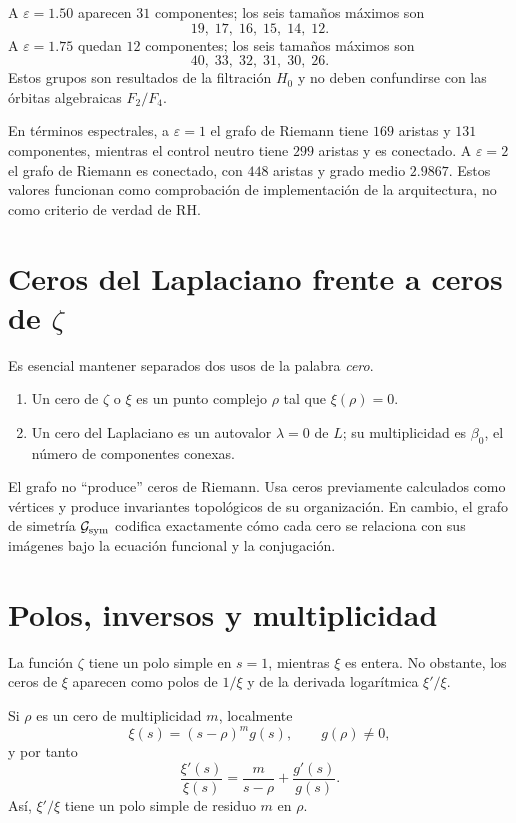 \documentclass[11pt]{amsart}
\theoremstyle{definition}
\theoremstyle{remark}
\begin{document}
A $\varepsilon=1.50$ aparecen $31$ componentes; los seis tamaños máximos son
\[
19,\;17,\;16,\;15,\;14,\;12.
\]
A $\varepsilon=1.75$ quedan $12$ componentes; los seis tamaños máximos son
\[
40,\;33,\;32,\;31,\;30,\;26.
\]
Estos grupos son resultados de la filtración $H_0$ y no deben confundirse con las órbitas algebraicas $F_2/F_4$.

En términos espectrales, a $\varepsilon=1$ el grafo de Riemann tiene $169$ aristas y $131$ componentes, mientras el control neutro tiene $299$ aristas y es conectado. A $\varepsilon=2$ el grafo de Riemann es conectado, con $448$ aristas y grado medio $2.9867$. Estos valores funcionan como comprobación de implementación de la arquitectura, no como criterio de verdad de RH.

\section{Ceros del Laplaciano frente a ceros de $\zeta$}
Es esencial mantener separados dos usos de la palabra \emph{cero}.

\begin{enumerate}[label=(\alph*)]
\item Un cero de $\zeta$ o $\xi$ es un punto complejo $\rho$ tal que $\xi(\rho)=0$.
\item Un cero del Laplaciano es un autovalor $\lambda=0$ de $L$; su multiplicidad es $\beta_0$, el número de componentes conexas.
\end{enumerate}

El grafo no ``produce'' ceros de Riemann. Usa ceros previamente calculados como vértices y produce invariantes topológicos de su organización. En cambio, el grafo de simetría $\mathcal G_{\rm sym}$ codifica exactamente cómo cada cero se relaciona con sus imágenes bajo la ecuación funcional y la conjugación.

\section{Polos, inversos y multiplicidad}
La función $\zeta$ tiene un polo simple en $s=1$, mientras $\xi$ es entera. No obstante, los ceros de $\xi$ aparecen como polos de $1/\xi$ y de la derivada logarítmica $\xi'/\xi$.

Si $\rho$ es un cero de multiplicidad $m$, localmente
\begin{equation}
 \xi(s)=(s-\rho)^m g(s),\qquad g(\rho)\neq0,
\end{equation}
y por tanto
\begin{equation}\label{eq:logder}
 \frac{\xi'(s)}{\xi(s)}=\frac{m}{s-\rho}+\frac{g'(s)}{g(s)}.
\end{equation}
Así, $\xi'/\xi$ tiene un polo simple de residuo $m$ en $\rho$.
\end{document}
